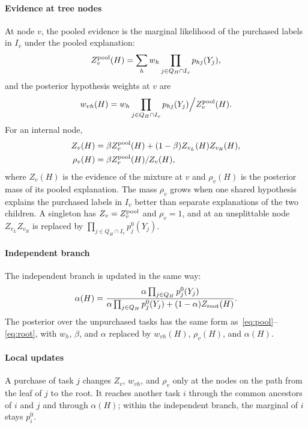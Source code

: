 \documentclass[journal]{IEEEtran}
\begin{document}
\paragraph{Evidence at tree nodes}
At node $v$, the pooled evidence is the marginal likelihood of the purchased labels in $I_v$ under the pooled explanation:
\begin{equation}
 Z_v^{\rm pool}(H)=\sum_h w_h\prod_{j\in Q_H\cap I_v}p_{hj}(Y_j),
 \label{eq:pool-evidence}
\end{equation}
and the posterior hypothesis weights at $v$ are
\begin{equation}
 w_{vh}(H)=w_h\prod_{j\in Q_H\cap I_v}p_{hj}(Y_j)\Big/Z_v^{\rm pool}(H).
 \label{eq:node-weights}
\end{equation}
For an internal node,
\begin{align}
 Z_v(H)&=\beta Z_v^{\rm pool}(H)+(1-\beta)Z_{v_L}(H)Z_{v_R}(H),\label{eq:evidence}\\
 \rho_v(H)&=\beta Z_v^{\rm pool}(H)/Z_v(H),\label{eq:rho}
\end{align}
where $Z_v(H)$ is the evidence of the mixture at $v$ and $\rho_v(H)$ is the posterior mass of its pooled explanation. The mass $\rho_v$ grows when one shared hypothesis explains the purchased labels in $I_v$ better than separate explanations of the two children. A singleton has $Z_v=Z_v^{\rm pool}$ and $\rho_v=1$, and at an unsplittable node $Z_{v_L}Z_{v_R}$ is replaced by $\prod_{j\in Q_H\cap I_v}p_j^0(Y_j)$.

\paragraph{Independent branch}
The independent branch is updated in the same way:
\begin{equation}
 \alpha(H)=\frac{\alpha\prod_{j\in Q_H}p_j^0(Y_j)}
 {\alpha\prod_{j\in Q_H}p_j^0(Y_j)+(1-\alpha)Z_{\rm root}(H)}.
 \label{eq:independent-weight}
\end{equation}
The posterior over the unpurchased tasks has the same form as~\eqref{eq:pool}--\eqref{eq:root}, with $w_h$, $\beta$, and $\alpha$ replaced by $w_{vh}(H)$, $\rho_v(H)$, and $\alpha(H)$.

\paragraph{Local updates}
A purchase of task $j$ changes $Z_v$, $w_{vh}$, and $\rho_v$ only at the nodes on the path from the leaf of $j$ to the root. It reaches another task $i$ through the common ancestors of $i$ and $j$ and through $\alpha(H)$; within the independent branch, the marginal of $i$ stays $p_i^0$.
\end{document}
